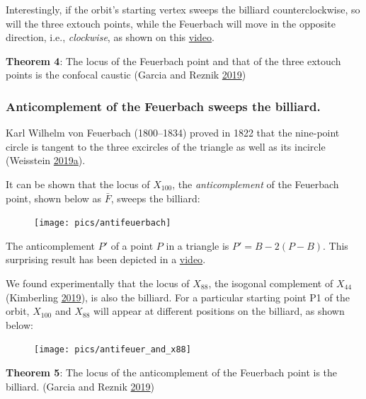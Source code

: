 \documentclass[]{article}
\begin{document}
Interestingly, if the orbit's starting vertex sweeps the billiard counterclockwise, so will the three extouch points, while the Feuerbach will move in the opposite direction, i.e., \emph{clockwise}, as shown on this \href{https://youtu.be/1gYb5Y3-rQI}{video}.

\textbf{Theorem 4}: The locus of the Feuerbach point and that of the three extouch points is the confocal caustic (Garcia and Reznik \protect\hyperlink{ref-garcia19a}{2019})

\hypertarget{anticomplement-of-the-feuerbach-sweeps-the-billiard.}{%
\subsubsection{Anticomplement of the Feuerbach sweeps the billiard.}\label{anticomplement-of-the-feuerbach-sweeps-the-billiard.}}

Karl Wilhelm von Feuerbach (1800--1834) proved in 1822 that the nine-point circle is tangent to the three excircles of the triangle as well as its incircle (Weisstein \protect\hyperlink{ref-mw}{2019}\protect\hyperlink{ref-mw}{a}).

It can be shown that the locus of \(X_{100}\), the \emph{anticomplement} of the Feuerbach point, shown below as \(\bar{F}\), sweeps the billiard:

\begin{figure}[H]

{\centering \texttt{[image: pics/antifeuerbach]} 

}

\end{figure}

The anticomplement \(P'\) of a point \(P\) in a triangle is \(P'=B-2(P-B)\). This surprising result has been depicted in a \href{https://youtu.be/8JKevLpteQk}{video}.

We found experimentally that the locus of \(X_{88}\), the isogonal complement of \(X_{44}\) (Kimberling \protect\hyperlink{ref-etc}{2019}), is also the billiard. For a particular starting point P1 of the orbit, \(X_{100}\) and \(X_{88}\) will appear at different positions on the billiard, as shown below:

\begin{figure}[H]

{\centering \texttt{[image: pics/antifeuer\_and\_x88]} 

}

\end{figure}

\textbf{Theorem 5}: The locus of the anticomplement of the Feuerbach point is the billiard. (Garcia and Reznik \protect\hyperlink{ref-garcia19a}{2019})
\end{document}
